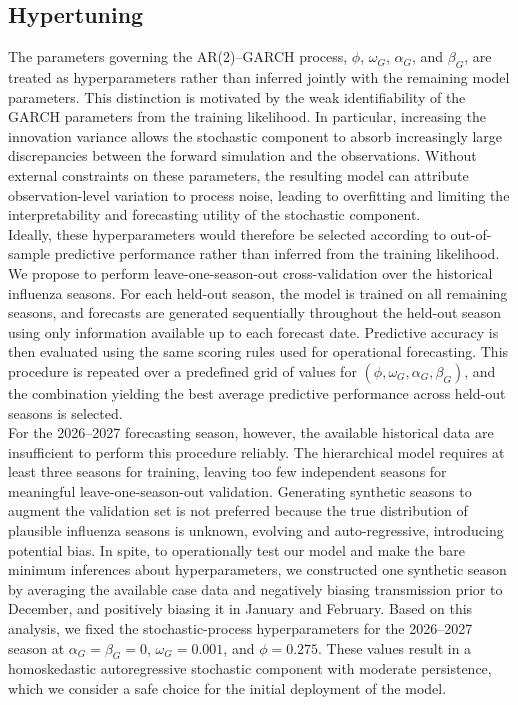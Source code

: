 \documentclass[11pt]{article}
\begin{document}
\subsection{Hypertuning}


The parameters governing the AR(2)--GARCH process, $\phi$, $\omega_G$, $\alpha_G$, and $\beta_G$, are treated as hyperparameters rather than inferred jointly with the remaining model parameters. This distinction is motivated by the weak identifiability of the GARCH parameters from the training likelihood. In particular, increasing the innovation variance allows the stochastic component to absorb increasingly large discrepancies between the forward simulation and the observations. Without external constraints on these parameters, the resulting model can attribute observation-level variation to process noise, leading to overfitting and limiting the interpretability and forecasting utility of the stochastic component.\\

Ideally, these hyperparameters would therefore be selected according to out-of-sample predictive performance rather than inferred from the training likelihood. We propose to perform leave-one-season-out cross-validation over the historical influenza seasons. For each held-out season, the model is trained on all remaining seasons, and forecasts are generated sequentially throughout the held-out season using only information available up to each forecast date. Predictive accuracy is then evaluated using the same scoring rules used for operational forecasting. This procedure is repeated over a predefined grid of values for $(\phi,\omega_G,\alpha_G,\beta_G)$, and the combination yielding the best average predictive performance across held-out seasons is selected.\\

For the 2026--2027 forecasting season, however, the available historical data are insufficient to perform this procedure reliably. The hierarchical model requires at least three seasons for training, leaving too few independent seasons for meaningful leave-one-season-out validation. Generating synthetic seasons to augment the validation set is not preferred because the true distribution of plausible influenza seasons is unknown, evolving and auto-regressive, introducing potential bias. In spite, to operationally test our model and make the bare minimum inferences about hyperparameters, we constructed one synthetic season by averaging the available case data and negatively biasing transmission prior to December, and positively biasing it in January and February. Based on this analysis, we fixed the stochastic-process hyperparameters for the 2026--2027 season at $\alpha_G=\beta_G=0$, $\omega_G=0.001$, and $\phi=0.275$. These values result in a homoskedastic autoregressive stochastic component with moderate persistence, which we consider a safe choice for the initial deployment of the model.
\end{document}
